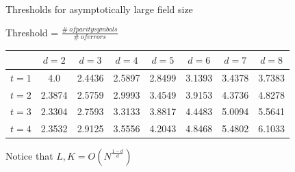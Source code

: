 	\begin{frame}{Thresholds for asymptotically large field size}
		
		\begin{block}{}
			\begin{center}
				\alert{Threshold} = $ \frac{\# \ of parity symbols}{\# \ of errors}$
			\end{center}
			
			\vspace{-6mm}
			\color{black}
			\begin{table}[ht]
				\centering
				\begin{tabular}{c|ccccccc}
					\hline
					& $d=2$ & $d=3$ & $d=4$ & $d=5$ & $d=6$ & $d=7$ & $d=8$ \\
					\hline
					\rowcolor{lightgray}
					$t=1$& 4.0  & 2.4436 & 2.5897 & 2.8499 & 3.1393 & 3.4378 & 3.7383 \\
					$t=2$& 2.3874 & 2.5759 & 2.9993 & 3.4549 & 3.9153 & 4.3736 & 4.8278 \\
					\rowcolor{lightgray}
					$t=3$& 2.3304 & 2.7593 & 3.3133 & 3.8817 & 4.4483 & 5.0094 & 5.5641 \\
					$t=4$& 2.3532 & 2.9125 & 3.5556& 4.2043 & 4.8468 & 5.4802 & 6.1033 \\
					
					\hline
				\end{tabular}
			\end{table}
			\vspace{-3mm}
			
			Notice that $L,K = O \left( N^{\frac{1-d}{d}}\right)$
		\end{block}
	\end{frame}

